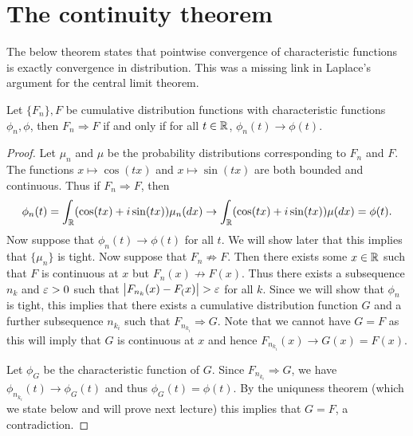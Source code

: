 \section{The continuity theorem}
The below theorem states that pointwise convergence of characteristic functions is exactly convergence in distribution. This was a missing link in Laplace's argument for the central limit theorem.
\begin{thrm}
    Let $\{F_n\},F$ be cumulative distribution functions with characteristic functions $\phi_n,\phi$, then $F_n \Rightarrow F$ if and only if for all $t \in {\mathbb R}$, $\phi_n(t)\to\phi(t)$.
\end{thrm}
\begin{proof}
    Let $\mu_n$ and $\mu$ be the probability distributions corresponding to $F_n$ and $F$. The functions $x\mapsto \cos(tx)$ and $x \mapsto \sin(tx)$ are both bounded and continuous. Thus if $F_n \Rightarrow F$, then 
    \[\phi_n(t) = \int_{\mathbb R} (\cos(tx)+i\sin(tx))\mu_n(dx) \to \int_{\mathbb R} (\cos(tx)+i\sin(tx))\mu(dx) = \phi(t). \]
    Now suppose that $\phi_n(t)\to\phi(t)$ for all $t$. We will show later that this implies that $\{\mu_n\}$ is tight. Now suppose that $F_n \not\Rightarrow F$. Then there exists some $x \in {\mathbb R}$ such that $F$ is continuous at $x$ but $F_n(x) \not\to F(x)$. Thus there exists a subsequence $n_k$ and $\varepsilon > 0$ such that ${\left\lvert F_{n_k}(x)-F_(x)\right\rvert} > \varepsilon$ for all $k$. Since we will show that $\phi_n$ is tight, this implies that there exists a cumulative distribution function $G$ and a further subsequence $n_{k_i}$ such that $F_{n_{k_i}}\Rightarrow G$. Note that we cannot have $G = F$ as this will imply that $G$ is continuous at $x$ and hence $F_{n_{k_i}}(x) \to G(x)=F(x)$. 

    Let $\phi_G$ be the characteristic function of $G$. Since $F_{n_{k_i}} \Rightarrow G$, we have $\phi_{n_{k_i}}(t)\to \phi_G(t)$ and thus $\phi_G(t)=\phi(t)$. By the uniquness theorem (which we state below and will prove next lecture) this implies that $G=F$, a contradiction.


\end{proof}
